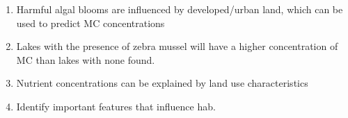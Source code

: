 \begin{enumerate}
 \item Harmful algal blooms are influenced by  developed/urban land, which can be used to predict MC concentrations
 \item Lakes with the presence of zebra mussel will have a higher concentration of MC than lakes with none found.
 \item Nutrient concentrations can be explained by land use characteristics
 \item Identify important features that influence \gls{hab}.

\end{enumerate}
